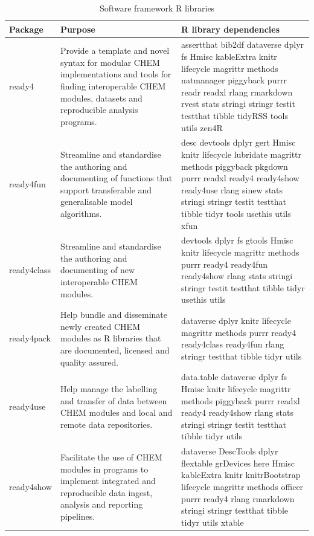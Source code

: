 \documentclass[sn-vancouver,Numbered,pdflatex]{sn-jnl}
\theoremstyle{remark}
\theoremstyle{definition}
\begin{document}
\begin{table}

\caption{\label{tab:cpkgs}Software framework R libraries}
\centering
\begin{tabular}[t]{l>{\raggedright\arraybackslash}m{20em}>{\raggedright\arraybackslash}m{20em}}
\toprule
Package & Purpose & R library dependencies\\
\midrule
ready4 & Provide a template and novel syntax for modular CHEM implementations and tools for finding interoperable CHEM modules, datasets and reproducible analysis programs. & assertthat bib2df dataverse dplyr fs Hmisc kableExtra knitr lifecycle magrittr methods natmanager piggyback purrr readr readxl rlang rmarkdown rvest stats stringi stringr testit testthat tibble tidyRSS tools utils zen4R\\
ready4fun & Streamline and standardise the authoring and documenting of functions that support transferable and generalisable model algorithms. & desc devtools dplyr gert Hmisc knitr lifecycle lubridate magrittr methods piggyback pkgdown purrr readxl ready4 ready4show ready4use rlang sinew stats stringi stringr testit testthat tibble tidyr tools usethis utils xfun\\
ready4class & Streamline and standardise the authoring and documenting of new interoperable CHEM modules. & devtools dplyr fs gtools Hmisc knitr lifecycle magrittr methods purrr ready4 ready4fun ready4show rlang stats stringi stringr testit testthat tibble tidyr usethis utils\\
ready4pack & Help bundle and disseminate newly created CHEM modules as R libraries that are documented, licensed and quality assured. & dataverse dplyr knitr lifecycle magrittr methods purrr ready4 ready4class ready4fun rlang stringr testthat tibble tidyr utils\\
ready4use & Help manage the labelling and transfer of data between CHEM modules and local and remote data repositories. & data.table dataverse dplyr fs Hmisc knitr lifecycle magrittr methods piggyback purrr readxl ready4 ready4show rlang stats stringi stringr testit testthat tibble tidyr utils\\
\addlinespace
ready4show & Facilitate the use of CHEM modules in programs to implement integrated and reproducible data ingest, analysis and reporting pipelines. & dataverse DescTools dplyr flextable grDevices here Hmisc kableExtra knitr knitrBootstrap lifecycle magrittr methods officer purrr ready4 rlang rmarkdown stringi stringr testthat tibble tidyr utils xtable\\
\bottomrule
\end{tabular}
\end{table}
\end{document}
